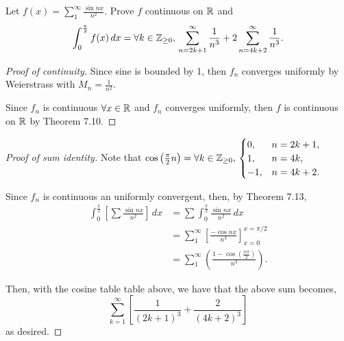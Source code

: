 \documentclass[../hw3]{subfiles}
\begin{document}
\begin{problem}
Let $f(x)=\sum_{1}^{\infty} \frac{\sin{nx} }{n^2}$.
Prove $f$ continuous on  $\mathbb{R}$ and \[
	\int_{0}^{\frac{\pi}{2} } f(x) \,dx = \forall k\in \mathbb{Z}_{\ge 0},\, \sum_{n=2k+1}^{\infty} \frac{1}{n^3}  + 2\sum_{n=4k+2}^{\infty} \frac{1}{n^3}
	.\]
\end{problem}
\begin{proof}[Proof of continuity]
	Since  sine is bounded by 1, then $f_n$ converges uniformly by Weierstrass with  $M_n=\frac{1}{n^2}$.

	Since $f_n$ is continuous  $\forall x \in \mathbb{R}$ and $f_n$ converges uniformly, then  $f$ is continuous on  $\mathbb{R}$ by Theorem 7.10.
\end{proof}
\begin{proof}[Proof of sum identity]

	Note that $\cos{\left( \frac{\pi}{2}n \right) } =\forall k \in \mathbb{Z}_{\ge 0},\, \begin{cases}
			0,  & n = 2k+1, \\
			1,  & n = 4k,   \\
			-1, & n = 4k+2. \\
		\end{cases}$

	Since $f_n$ is continuous an uniformly convergent, then, by Theorem 7.13,
	\begin{align*}
		\int_{0}^{\frac{\pi}{2} } \left[ \sum \frac{\sin{nx} }{n^2} \right] \,dx & = \sum \int_{0}^{\frac{\pi}{2} } \frac{\sin{nx} }{n^2} \,dx                   \\
		                                                                         & = \sum_1^{\infty}\left[\frac{-\cos{nx}}{n^3}\right]_{x=0}^{x=\pi/2}           \\
		                                                                         & = \sum_1^{\infty}\left(\frac{1-\cos{\left(\frac{n\pi}{2}\right)}}{n^3}\right)
		.\end{align*}

	Then, with the cosine table table above, we have that the above sum becomes, \[
		\sum_{k=1}^{\infty} \left[ \frac{1}{(2k+1)^3} + \frac{2}{(4k+2)^3} \right]
	\] as desired.
\end{proof}
\end{document}
